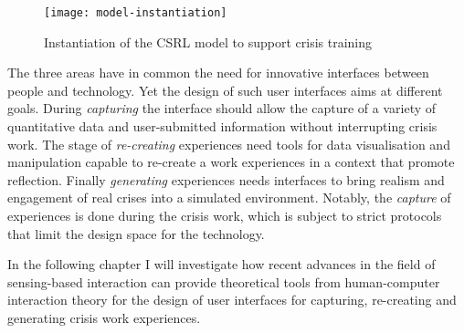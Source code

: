 \begin{figure}[htb]
    \centering
    \texttt{[image: model-instantiation]}
    \caption{Instantiation of the CSRL model to support crisis training}
    \label{fig:model-instantiation}
\end{figure}

The three areas have in common the need for innovative interfaces
between people and technology. Yet the design of such user interfaces
aims at different goals. During \emph{capturing} the interface should
allow the capture of a variety of quantitative data and user-submitted
information without interrupting crisis work. The stage of
\emph{re-creating} experiences need tools for data visualisation and
manipulation capable to re-create a work experiences in a context that
promote reflection. Finally \emph{generating} experiences needs
interfaces to bring realism and engagement of real crises into a
simulated environment. Notably, the \emph{capture} of experiences is
done during the crisis work, which is subject to strict protocols that
limit the design space for the technology.

In the following chapter I will investigate how recent advances in the
field of sensing-based interaction can provide theoretical tools from
human-computer interaction theory for the design of user interfaces for
capturing, re-creating and generating crisis work experiences.
